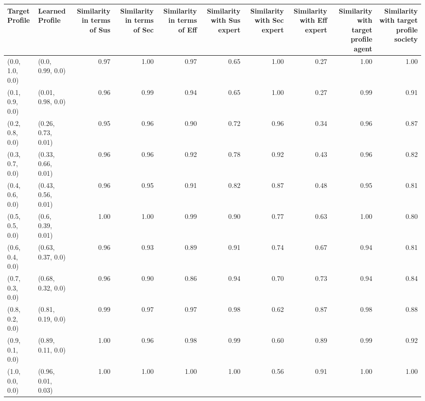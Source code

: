 \begin{tabular}{llrrrrrrrr}
\toprule
Target Profile & Learned Profile & Similarity in terms of Sus & Similarity in terms of Sec & Similarity in terms of Eff & Similarity with Sus expert & Similarity with Sec expert & Similarity with Eff expert & Similarity with target profile agent & Similarity with target profile society \\
\midrule
(0.0, 1.0, 0.0) & (0.0, 0.99, 0.0) & 0.97 & 1.00 & 0.97 & 0.65 & 1.00 & 0.27 & 1.00 & 1.00 \\
(0.1, 0.9, 0.0) & (0.01, 0.98, 0.0) & 0.96 & 0.99 & 0.94 & 0.65 & 1.00 & 0.27 & 0.99 & 0.91 \\
(0.2, 0.8, 0.0) & (0.26, 0.73, 0.01) & 0.95 & 0.96 & 0.90 & 0.72 & 0.96 & 0.34 & 0.96 & 0.87 \\
(0.3, 0.7, 0.0) & (0.33, 0.66, 0.01) & 0.96 & 0.96 & 0.92 & 0.78 & 0.92 & 0.43 & 0.96 & 0.82 \\
(0.4, 0.6, 0.0) & (0.43, 0.56, 0.01) & 0.96 & 0.95 & 0.91 & 0.82 & 0.87 & 0.48 & 0.95 & 0.81 \\
(0.5, 0.5, 0.0) & (0.6, 0.39, 0.01) & 1.00 & 1.00 & 0.99 & 0.90 & 0.77 & 0.63 & 1.00 & 0.80 \\
(0.6, 0.4, 0.0) & (0.63, 0.37, 0.0) & 0.96 & 0.93 & 0.89 & 0.91 & 0.74 & 0.67 & 0.94 & 0.81 \\
(0.7, 0.3, 0.0) & (0.68, 0.32, 0.0) & 0.96 & 0.90 & 0.86 & 0.94 & 0.70 & 0.73 & 0.94 & 0.84 \\
(0.8, 0.2, 0.0) & (0.81, 0.19, 0.0) & 0.99 & 0.97 & 0.97 & 0.98 & 0.62 & 0.87 & 0.98 & 0.88 \\
(0.9, 0.1, 0.0) & (0.89, 0.11, 0.0) & 1.00 & 0.96 & 0.98 & 0.99 & 0.60 & 0.89 & 0.99 & 0.92 \\
(1.0, 0.0, 0.0) & (0.96, 0.01, 0.03) & 1.00 & 1.00 & 1.00 & 1.00 & 0.56 & 0.91 & 1.00 & 1.00 \\
\bottomrule
\end{tabular}
